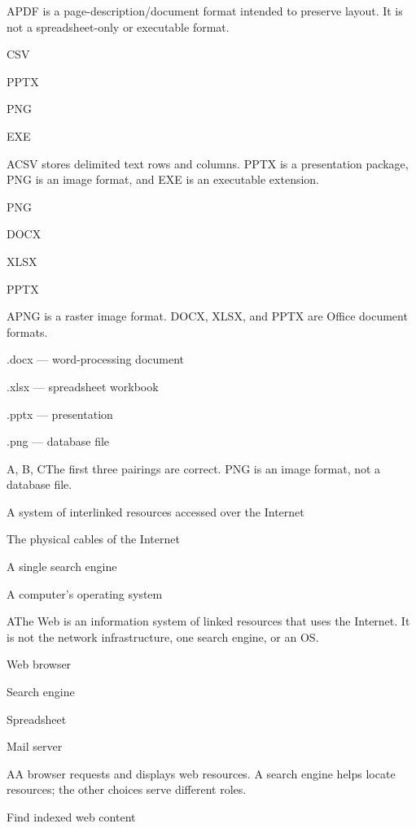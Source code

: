 \begin{enumerate}[label=\textbf{Q\arabic*.}, leftmargin=*]
  {A}{PDF is a page-description/document format intended to preserve layout. It is not a spreadsheet-only or executable format.}
  {\item CSV
   \item PPTX
   \item PNG
   \item EXE}
  {A}{CSV stores delimited text rows and columns. PPTX is a presentation package, PNG is an image format, and EXE is an executable extension.}
  {\item PNG
   \item DOCX
   \item XLSX
   \item PPTX}
  {A}{PNG is a raster image format. DOCX, XLSX, and PPTX are Office document formats.}
  {\item .docx --- word-processing document
   \item .xlsx --- spreadsheet workbook
   \item .pptx --- presentation
   \item .png --- database file}
  {A, B, C}{The first three pairings are correct. PNG is an image format, not a database file.}
\fi
\ifnum{}
  {\item A system of interlinked resources accessed over the Internet
   \item The physical cables of the Internet
   \item A single search engine
   \item A computer's operating system}
  {A}{The Web is an information system of linked resources that uses the Internet. It is not the network infrastructure, one search engine, or an OS.}
  {\item Web browser
   \item Search engine
   \item Spreadsheet
   \item Mail server}
  {A}{A browser requests and displays web resources. A search engine helps locate resources; the other choices serve different roles.}
  {\item Find indexed web content
}
\end{enumerate}

